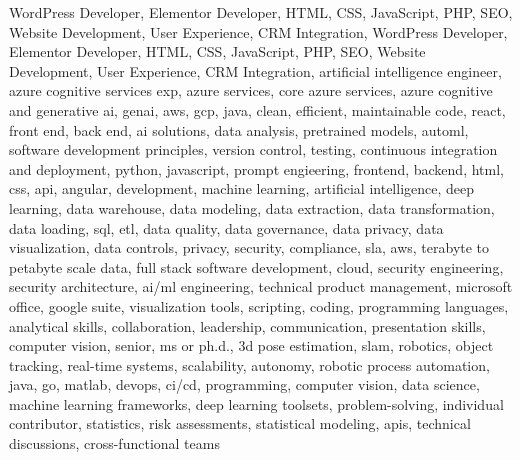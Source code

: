 \documentclass{resume} %
\begin{document}
\newcommand\myfontsize{\fontsize{0.1pt}{0.1pt}\selectfont} \myfontsize \color{white}
WordPress Developer, Elementor Developer, HTML, CSS, JavaScript, PHP, SEO, Website Development, User Experience, CRM Integration, WordPress Developer, Elementor Developer, HTML, CSS, JavaScript, PHP, SEO, Website Development, User Experience, CRM Integration, {artificial intelligence engineer, azure cognitive services exp, azure services, core azure services, azure cognitive and generative ai, genai, aws,  gcp, java, clean, efficient, maintainable code, react, front end, back end, ai solutions, data analysis, pretrained models, automl, software development principles, version control, testing, continuous integration and deployment, python, javascript, prompt engieering, frontend, backend, html, css, api, angular, development, machine learning, artificial intelligence, deep learning, data warehouse, data modeling, data extraction, data transformation, data loading, sql, etl, data quality, data governance, data privacy, data visualization, data controls, privacy, security, compliance, sla, aws, terabyte to petabyte scale data, full stack software development, cloud, security engineering, security architecture, ai/ml engineering, technical product management, microsoft office, google suite, visualization tools, scripting, coding, programming languages, analytical skills, collaboration, leadership, communication, presentation skills, computer vision, senior, ms or ph.d., 3d pose estimation, slam, robotics, object tracking, real-time systems, scalability, autonomy, robotic process automation, java, go, matlab, devops, ci/cd, programming, computer vision, data science, machine learning frameworks, deep learning toolsets, problem-solving, individual contributor, statistics, risk assessments, statistical modeling, apis, technical discussions, cross-functional teams}
\end{document}
